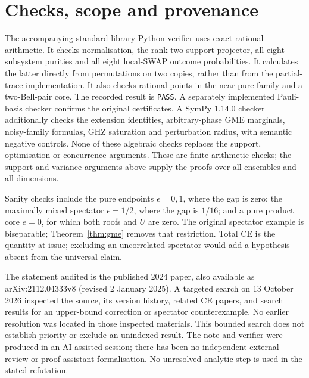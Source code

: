 \documentclass[11pt,a4paper]{article}
\begin{document}
\section{Checks, scope and provenance}
The accompanying standard-library Python verifier uses exact rational arithmetic. It checks normalisation, the rank-two support projector, all eight subsystem purities and all eight local-SWAP outcome probabilities. It calculates the latter directly from permutations on two copies, rather than from the partial-trace implementation. It also checks rational points in the near-pure family and a two-Bell-pair core. The recorded result is \texttt{PASS}. A separately implemented Pauli-basis checker confirms the original certificates. A SymPy 1.14.0 checker additionally checks the extension identities, arbitrary-phase GME marginals, noisy-family formulas, GHZ saturation and perturbation radius, with semantic negative controls. None of these algebraic checks replaces the support, optimisation or concurrence arguments. These are finite arithmetic checks; the support and variance arguments above supply the proofs over all ensembles and all dimensions.

Sanity checks include the pure endpoints $\epsilon=0,1$, where the gap is zero; the maximally mixed spectator $\epsilon=1/2$, where the gap is $1/16$; and a pure product core $e=0$, for which both roofs and $U$ are zero. The original spectator example is biseparable; Theorem~\ref{thm:gme} removes that restriction. Total CE is the quantity at issue; excluding an uncorrelated spectator would add a hypothesis absent from the universal claim.

The statement audited is the published 2024 paper, also available as arXiv:2112.04333v8 (revised 2 January 2025). A targeted search on 13 October 2026 inspected the source, its version history, related CE papers, and search results for an upper-bound correction or spectator counterexample. No earlier resolution was located in those inspected materials. This bounded search does not establish priority or exclude an unindexed result. The note and verifier were produced in an AI-assisted session; there has been no independent external review or proof-assistant formalisation. No unresolved analytic step is used in the stated refutation.
\end{document}
